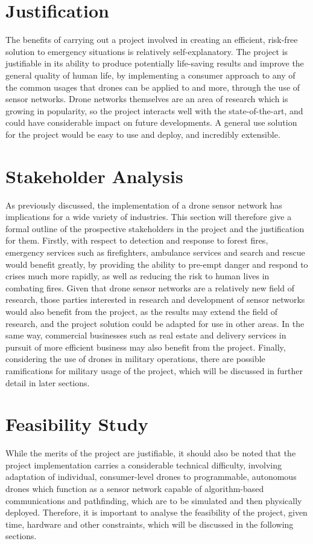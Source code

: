 	\section{Justification}
	The benefits of carrying out a project involved in creating an efficient, risk-free solution to emergency situations is relatively self-explanatory. The project is justifiable in its ability to produce potentially life-saving results and improve the general quality of human life, by implementing a consumer approach to any of the common usages that drones can be applied to and more, through the use of sensor networks. Drone networks themselves are an area of research which is growing in popularity, so the project interacts well with the state-of-the-art, and could have considerable impact on future developments. A general use solution for the project would be easy to use and deploy, and incredibly extensible.
	\section{Stakeholder Analysis}
	As previously discussed, the implementation of a drone sensor network has implications for a wide variety of industries. This section will therefore give a formal outline of the prospective stakeholders in the project and the justification for them. Firstly, with respect to detection and response to forest fires, emergency services such as firefighters, ambulance services and search and rescue would benefit greatly, by providing the ability to pre-empt danger and respond to crises much more rapidly, as well as reducing the risk to human lives in combating fires. Given that drone sensor networks are a relatively new field of research, those parties interested in research and development of sensor networks would also benefit from the project, as the results may extend the field of research, and the project solution could be adapted for use in other areas. In the same way, commercial businesses such as real estate and delivery services in pursuit of more efficient business may also benefit from the project. Finally, considering the use of drones in military operations, there are possible ramifications for military usage of the project, which will be discussed in further detail in later sections.
	\section{Feasibility Study}
	While the merits of the project are justifiable, it should also be noted that the project implementation carries a considerable technical difficulty, involving adaptation of individual, consumer-level drones to programmable, autonomous drones which function as a sensor network capable of algorithm-based communications and pathfinding, which are to be simulated and then physically deployed. Therefore, it is important to analyse the feasibility of the project, given time, hardware and other constraints, which will be discussed in the following sections.
